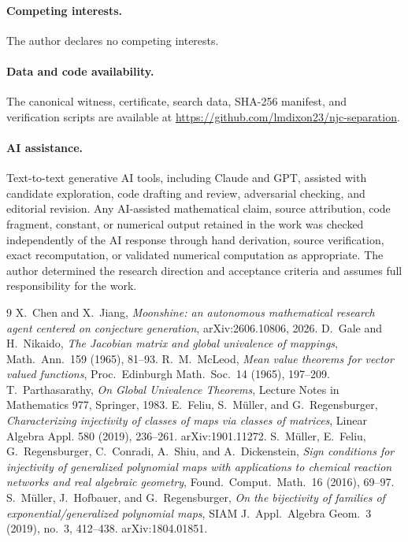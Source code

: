 \documentclass[11pt]{article}
\theoremstyle{definition}
\theoremstyle{remark}
\begin{document}
\paragraph{Competing interests.} The author declares no competing interests.
\paragraph{Data and code availability.} The canonical witness, certificate, search data, SHA-256
manifest, and verification scripts are available at
\url{https://github.com/lmdixon23/njc-separation}.
\paragraph{AI assistance.} Text-to-text generative AI tools, including Claude and GPT, assisted with
candidate exploration, code drafting and review, adversarial checking, and editorial revision. Any
AI-assisted mathematical claim, source attribution, code fragment, constant, or numerical output
retained in the work was checked independently of the AI response through hand derivation, source
verification, exact recomputation, or validated numerical computation as appropriate. The author
determined the research direction and acceptance criteria and assumes full responsibility for the
work.

\begin{thebibliography}{9}
 X.~Chen and X.~Jiang, \emph{Moonshine: an autonomous
mathematical research agent centered on conjecture generation},
arXiv:2606.10806, 2026.
 D.~Gale and H.~Nikaido, \emph{The Jacobian matrix and
global univalence of mappings}, Math.\ Ann.\ 159 (1965), 81--93.
 R.~M.~McLeod, \emph{Mean value theorems for vector valued
functions}, Proc.\ Edinburgh Math.\ Soc.\ 14 (1965), 197--209.
 T.~Parthasarathy, \emph{On Global Univalence
Theorems}, Lecture Notes in Mathematics 977, Springer, 1983.
 E.~Feliu, S.~M\"uller, and G.~Regensburger,
\emph{Characterizing injectivity of classes of maps via classes of
matrices}, Linear Algebra Appl. 580 (2019), 236--261. arXiv:1901.11272.
 S.~M\"uller, E.~Feliu, G.~Regensburger, C.~Conradi,
A.~Shiu, and A.~Dickenstein, \emph{Sign conditions for injectivity of
generalized polynomial maps with applications to chemical reaction
networks and real algebraic geometry}, Found.\ Comput.\ Math.\ 16 (2016),
69--97.
 S.~M\"uller, J.~Hofbauer, and G.~Regensburger, \emph{On the
bijectivity of families of exponential/generalized polynomial maps},
SIAM J.\ Appl.\ Algebra Geom.\ 3 (2019), no.~3, 412--438.
arXiv:1804.01851.
\end{thebibliography}
\end{document}
